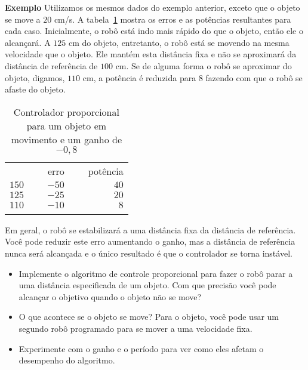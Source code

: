 \smallskip

\noindent\textbf{Exemplo} Utilizamos os mesmos dados do exemplo anterior, exceto que o objeto se move a $20$ cm/s. A tabela~\ref{tab.p-controller-moving} mostra os erros e as potências resultantes para cada caso. Inicialmente, o robô está indo mais rápido do que o objeto, então ele o alcançará. A $125$ cm do objeto, entretanto, o robô está se movendo na mesma velocidade que o objeto. Ele mantém esta distância fixa e não se aproximará da distância de referência de $100$ cm. Se de alguma forma o robô se aproximar do objeto, digamos, $110$ cm, a potência é reduzida para $8$ fazendo com que o robô se afaste do objeto.

\begin{table}
\caption{Controlador proporcional para um objeto em movimento e um ganho de $-0,8$}
\label{tab.p-controller-moving}
\begin{tabular}{rrr}
\hline\noalign{\smallskip}
\multicolumn{1}{c}{distância} & \multicolumn{1}{c}{\ \ \ erro}& \multicolumn{1}{c}{\ \ \ potência}\\
\noalign{\smallskip}\hline\noalign{\smallskip}
$150$ & $-50$ & $40$\\
$125$ & $-25$ & $20$\\
$110$ & $-10$ & $8$\\
\noalign{\smallskip}\hline\noalign{\smallskip}
\end{tabular}
\end{table}

Em geral, o robô se estabilizará a uma distância fixa da distância de referência. Você pode reduzir este erro aumentando o ganho, mas a distância de referência nunca será alcançada e o único resultado é que o controlador se torna instável.

\begin{framed}
\begin{itemize}
\item Implemente o algoritmo de controle proporcional para fazer o robô parar a uma distância especificada de um objeto. Com que precisão você pode alcançar o objetivo quando o objeto não se move?
\item O que acontece se o objeto se move? Para o objeto, você pode usar um segundo robô programado para se mover a uma velocidade fixa.
\item Experimente com o ganho e o período para ver como eles afetam o desempenho do algoritmo.
\end{itemize}
\end{framed}

